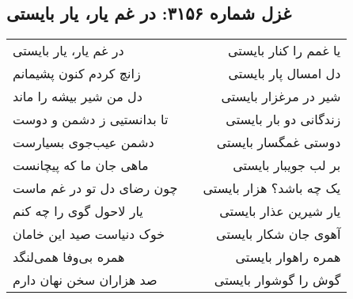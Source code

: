 \begin{center}
\section*{غزل شماره ۳۱۵۶: در غم یار، یار بایستی}
\label{sec:3156}
\begin{longtable}{l p{0.5cm} r}
در غم یار، یار بایستی
&&
یا غمم را کنار بایستی
\\
زانچ کردم کنون پشیمانم
&&
دل امسال پار بایستی
\\
دل من شیر بیشه را ماند
&&
شیر در مرغزار بایستی
\\
تا بدانستیی ز دشمن و دوست
&&
زندگانی دو بار بایستی
\\
دشمن عیب‌جوی بسیارست
&&
دوستی غمگسار بایستی
\\
ماهی جان ما که پیچانست
&&
بر لب جویبار بایستی
\\
چون رضای دل تو در غم ماست
&&
یک چه باشد؟ هزار بایستی
\\
یار لاحول گوی را چه کنم
&&
یار شیرین عذار بایستی
\\
خوک دنیاست صید این خامان
&&
آهوی جان شکار بایستی
\\
همره بی‌وفا همی‌لنگد
&&
همره راهوار بایستی
\\
صد هزاران سخن نهان دارم
&&
گوش را گوشوار بایستی
\\
\end{longtable}
\end{center}
